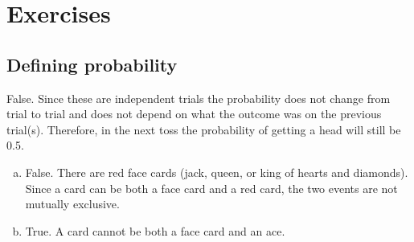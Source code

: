 \section{Exercises}


\subsection{Defining probability}



{False. Since these are independent trials the probability does not change from trial to trial and does not depend on what the outcome was on the previous trial(s). Therefore, in the next toss the probability of getting a head will still be 0.5.}


{
\begin{enumerate}[(a)]
\setlength{\itemsep}{0mm}
\item False. There are red face cards (jack, queen, or king of hearts and diamonds). Since a card can be both a face card and a red card, the two events are not mutually exclusive.
\item True. A card cannot be both a face card and an ace.
\end{enumerate}
}


